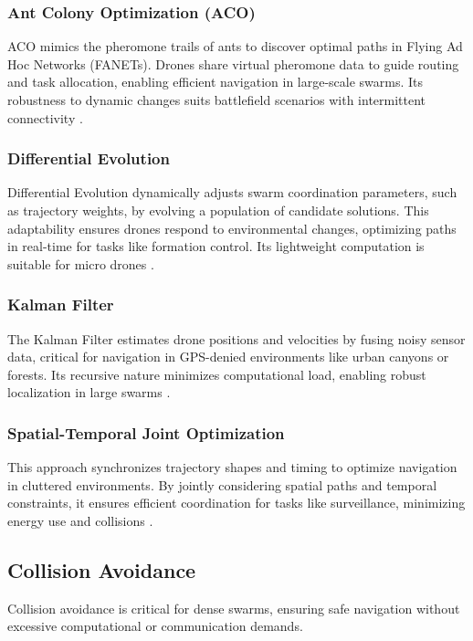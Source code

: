 \documentclass{article}
\begin{document}
\subsubsection{Ant Colony Optimization (ACO)}
ACO mimics the pheromone trails of ants to discover optimal paths in Flying Ad Hoc Networks (FANETs). Drones share virtual pheromone data to guide routing and task allocation, enabling efficient navigation in large-scale swarms. Its robustness to dynamic changes suits battlefield scenarios with intermittent connectivity \cite{Dorigo1997, Yang2018}.

\subsubsection{Differential Evolution}
Differential Evolution dynamically adjusts swarm coordination parameters, such as trajectory weights, by evolving a population of candidate solutions. This adaptability ensures drones respond to environmental changes, optimizing paths in real-time for tasks like formation control. Its lightweight computation is suitable for micro drones \cite{Storn1997, Das2016}.

\subsubsection{Kalman Filter}
The Kalman Filter estimates drone positions and velocities by fusing noisy sensor data, critical for navigation in GPS-denied environments like urban canyons or forests. Its recursive nature minimizes computational load, enabling robust localization in large swarms \cite{Kalman1960, Welch2006}.

\subsubsection{Spatial-Temporal Joint Optimization}
This approach synchronizes trajectory shapes and timing to optimize navigation in cluttered environments. By jointly considering spatial paths and temporal constraints, it ensures efficient coordination for tasks like surveillance, minimizing energy use and collisions \cite{Lin2018, Chen2020}.

\subsection{Collision Avoidance}
Collision avoidance is critical for dense swarms, ensuring safe navigation without excessive computational or communication demands.
\end{document}
